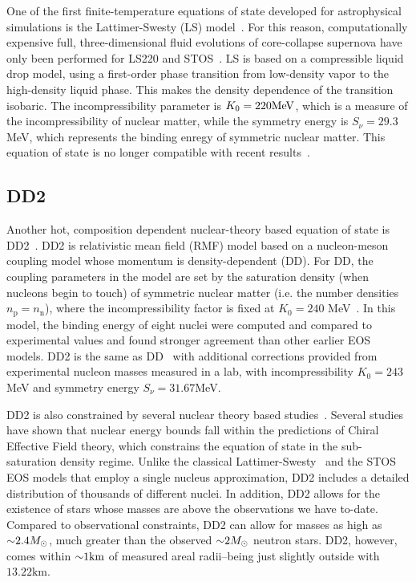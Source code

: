 One of the first finite-temperature equations of state developed for astrophysical simulations is the Lattimer-Swesty (LS) model~\cite{Lattimer:1991nc}.  
For this reason, computationally expensive full, three-dimensional fluid evolutions of core-collapse supernova have only been performed for LS220 and STOS~\cite{Marek2009}.
LS is based on a compressible liquid drop model, using a first-order phase transition from low-density vapor to the high-density liquid phase.  
This makes the density dependence of the transition isobaric.  
The incompressibility parameter is $K_0 = 220 {\rm MeV}$, which is a measure of the incompressibility of nuclear matter, while the symmetry energy is $S_\nu = 29.3$MeV, which represents the binding enregy of symmetric nuclear matter.
This equation of state is no longer compatible with recent results~\cite{Fischer2014}.

\subsection{DD2}
\label{sec:dd2}

Another hot, composition dependent nuclear-theory based equation of state is DD2~\cite{typel2010composition}.  DD2 is relativistic mean field (RMF) model based on a nucleon-meson coupling model whose momentum is density-dependent (DD).  
For DD, the coupling parameters in the model are set by the saturation density (when nucleons begin to touch) of symmetric nuclear matter (i.e. the number densities $n_\textrm{p} = n_\textrm{n}$), where the incompressibility factor is fixed at $K_0 = 240$ MeV~\cite{typel2005relativistic}.
In this model, the binding energy of eight nuclei were computed and compared to experimental values and found stronger agreement than other earlier EOS models.
DD2 is the same as DD~\cite{typel2005relativistic} with additional corrections provided from experimental nucleon masses measured in a lab, with incompressibility $K_0 = 243$MeV and symmetry energy $S_\nu=31.67$MeV.

DD2 is also constrained by several nuclear theory based studies~\cite{hempel2012new}.
Several studies have shown that nuclear energy bounds fall within the predictions of Chiral Effective Field theory, which constrains the equation of state in the sub-saturation density regime.
Unlike the classical Lattimer-Swesty~\cite{Lattimer:1991nc} and the STOS ~\cite{Shen:1998gq} EOS models that employ a single nucleus approximation, DD2 includes a detailed distribution of thousands of different nuclei.
In addition, DD2 allows for the existence of stars whose masses are above the observations we have to-date.
Compared to observational constraints, DD2 can allow for masses as high as $\mathord{\sim} 2.4 M_\odot$, much greater than the observed $\mathord{\sim} 2 M_\odot$ neutron stars.
DD2, however, comes within $\mathord{\sim} 1 \textrm{km}$ of measured areal radii--being just slightly outside with $13.22 \textrm{km}$.

